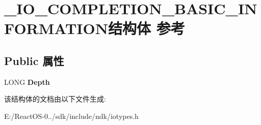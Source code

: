 \hypertarget{struct___i_o___c_o_m_p_l_e_t_i_o_n___b_a_s_i_c___i_n_f_o_r_m_a_t_i_o_n}{}\section{\+\_\+\+I\+O\+\_\+\+C\+O\+M\+P\+L\+E\+T\+I\+O\+N\+\_\+\+B\+A\+S\+I\+C\+\_\+\+I\+N\+F\+O\+R\+M\+A\+T\+I\+O\+N结构体 参考}
\label{struct___i_o___c_o_m_p_l_e_t_i_o_n___b_a_s_i_c___i_n_f_o_r_m_a_t_i_o_n}
\subsection*{Public 属性}
\begin{DoxyCompactItemize}
\item 
\mbox{\label{struct___i_o___c_o_m_p_l_e_t_i_o_n___b_a_s_i_c___i_n_f_o_r_m_a_t_i_o_n_a563e9d590d43be1080b105abe306da72}} 
L\+O\+NG {\bfseries Depth}
\end{DoxyCompactItemize}


该结构体的文档由以下文件生成\+:\begin{DoxyCompactItemize}
\item 
E\+:/\+React\+O\+S-\/0../sdk/include/ndk/iotypes.\+h\end{DoxyCompactItemize}

